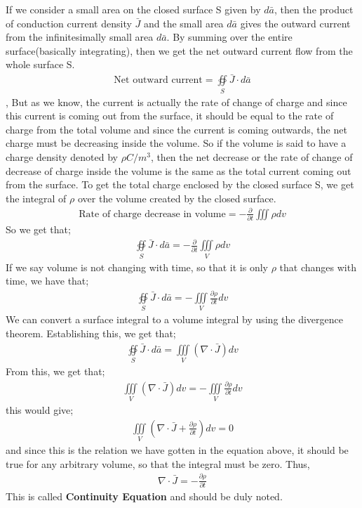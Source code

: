 If we consider a small area on the closed surface S given by $d\bar{a}$, then the product of conduction current density $\bar{J}$ and the small area $d\bar{a}$ gives the outward current from the infinitesimally small area $d\bar{a}$. By summing over the entire surface(basically integrating), then we get the net outward current flow from the whole surface S.
\begin{align*}
\text{Net outward current}= \oiint\limits_S\bar{J}\cdot d\bar{a}
\end{align*},
But as we know, the current is actually the rate of change of charge and since this current is coming out from the surface, it should be equal to the rate of charge from the total volume and since the current is coming outwards, the net charge must be decreasing inside the volume. So if the volume is said to have a charge density denoted by $\rho C/m^{3}$, then the net decrease or the rate of change of decrease of charge inside the volume is the same as the total current coming out from the surface. To get the total charge enclosed by the closed surface S, we get the integral of $\rho$ over the volume created by the closed surface.
\begin{align*}
\text{Rate of charge decrease in volume}	= -\frac{\partial}{\partial t}\iiint \rho dv
\end{align*}
So we get that;
\begin{align*}
\oiint\limits_S\bar{J}\cdot d\bar{a} = -\frac{\partial}{\partial t}\iiint\limits_V\rho dv
\end{align*}
If we say volume is not changing with time, so that it is only $\rho$ that changes with time, we have that;
\begin{align*}
\oiint\limits_S\bar{J}\cdot d\bar{a} = -\iiint\limits_V\frac{\partial\rho}{\partial t}dv
\end{align*}
We can convert a surface integral to a volume integral by using the divergence theorem. Establishing this, we get that;
\begin{align*}
\oiint\limits_S\bar{J}\cdot d\bar{a} = \iiint\limits_V(\nabla\cdot\bar{J})dv
\end{align*}
From this, we get that;
\begin{align*}
\iiint\limits_V(\nabla\cdot\bar{J})dv = -\iiint\limits_V\frac{\partial\rho}{\partial t}dv
\end{align*}
this would give;
\begin{align*}
\iiint\limits_V(\nabla\cdot\bar{J} + \frac{\partial\rho}{\partial t} )dv = 0
\end{align*}
and since this is the relation we have gotten in the equation above, it should be true for any arbitrary volume, so that the integral must be zero. Thus,
\begin{align}
\nabla\cdot\bar{J} = -\frac{\partial\rho}{\partial t}
\end{align}
This is called \textbf{Continuity Equation} and should be duly noted.

